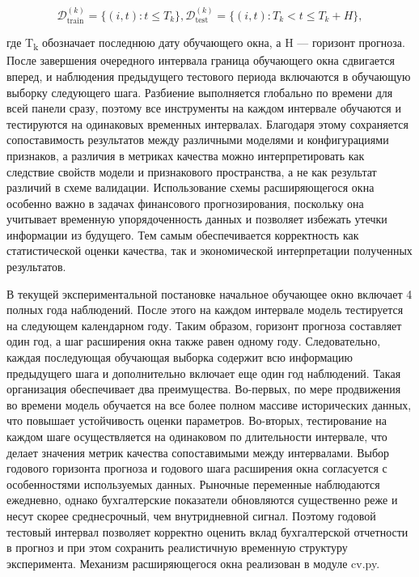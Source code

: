 \documentclass[
]{article}
\begin{document}
\[\mathcal{D}_{\text{train}}^{(k)} = \{(i,t):t \leq T_{k}\},\mathcal{D}_{\text{test}}^{(k)} = \{(i,t):T_{k} < t \leq T_{k} + H\},\]

где T\textsubscript{k} обозначает последнюю дату обучающего окна, а H --- горизонт прогноза. После завершения очередного интервала граница обучающего окна сдвигается вперед, и наблюдения предыдущего тестового периода включаются в обучающую выборку следующего шага. Разбиение выполняется глобально по времени для всей панели сразу, поэтому все инструменты на каждом интервале обучаются и тестируются на одинаковых временных интервалах. Благодаря этому сохраняется сопоставимость результатов между различными моделями и конфигурациями признаков, а различия в метриках качества можно интерпретировать как следствие свойств модели и признакового пространства, а не как результат различий в схеме валидации. Использование схемы расширяющегося окна особенно важно в задачах финансового прогнозирования, поскольку она учитывает временную упорядоченность данных и позволяет избежать утечки информации из будущего. Тем самым обеспечивается корректность как статистической оценки качества, так и экономической интерпретации полученных результатов.

В текущей экспериментальной постановке начальное обучающее окно включает 4 полных года наблюдений. После этого на каждом интервале модель тестируется на следующем календарном году. Таким образом, горизонт прогноза составляет один год, а шаг расширения окна также равен одному году. Следовательно, каждая последующая обучающая выборка содержит всю информацию предыдущего шага и дополнительно включает еще один год наблюдений. Такая организация обеспечивает два преимущества. Во-первых, по мере продвижения во времени модель обучается на все более полном массиве исторических данных, что повышает устойчивость оценки параметров. Во-вторых, тестирование на каждом шаге осуществляется на одинаковом по длительности интервале, что делает значения метрик качества сопоставимыми между интервалами. Выбор годового горизонта прогноза и годового шага расширения окна согласуется с особенностями используемых данных. Рыночные переменные наблюдаются ежедневно, однако бухгалтерские показатели обновляются существенно реже и несут скорее среднесрочный, чем внутридневной сигнал. Поэтому годовой тестовый интервал позволяет корректно оценить вклад бухгалтерской отчетности в прогноз и при этом сохранить реалистичную временную структуру эксперимента. Механизм расширяющегося окна реализован в модуле cv.py.
\end{document}
